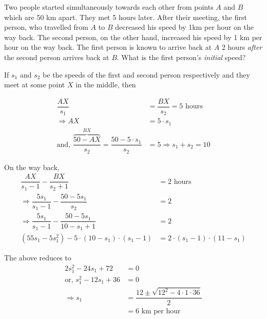 

\question[5] Two people started simultaneously towards each other from points $A$ and $B$ which 
are 50 km apart. They met 5 hours later. After their meeting, the first person, who travelled 
from $A$ to $B$ decreased his speed by 1km per hour on the way back. The second person, 
on the other hand, increased his speed by 1 km per hour on the way back. The first person 
is known to arrive back at $A$ 2 hours \textit{after} the second person arrives back at $B$. What is 
the first person's \textit{initial} speed?


\ifprintanswers
\fi 

\begin{solution}[\fullpage]
	If $s_1$ and $s_2$ be the speeds of the first and second person respectively and they
	meet at some point $X$ in the middle, then 
	
	\begin{align}
		\dfrac{AX}{s_1} &= \dfrac{BX}{s_2} = 5\text{ hours} \\
		\Rightarrow AX &= 5\cdot s_1 \\
		\text{and, } \dfrac{\overbrace{50-AX}^{BX}}{s_2} = \dfrac{50-5\cdot s_1}{s_2} &= 5 \Rightarrow s_1 + s_2 = 10
	\end{align}
	
	On the way back, 
	\begin{align}
		\dfrac{AX}{s_1 - 1} - \dfrac{BX}{s_2 + 1} &= 2\text{ hours} \\
		\Rightarrow \dfrac{5s_1}{s_1 - 1} - \dfrac{50 - 5s_1}{s_2} &= 2 \\
		\Rightarrow \dfrac{5s_1}{s_1 - 1} - \dfrac{50 - 5s_1}{10-s_1+1} &= 2 \\
		(55s_1 - 5s_1^2) - 5\cdot(10-s_1)\cdot(s_1-1) &= 2\cdot(s_1-1)\cdot(11-s_1)
	\end{align}
	
	The above reduces to 
	\begin{align}
		2s_1^2 - 24s_1 + 72 &= 0 \\
		\text{or, }s_1^2 -12s_1 + 36 &= 0 \\
		\Rightarrow s_1 &= \dfrac{12\pm\sqrt{12^2 - 4\cdot 1 \cdot 36}}{2} \\
		                &= 6\text{ km per hour}
	\end{align}
	
\end{solution}

